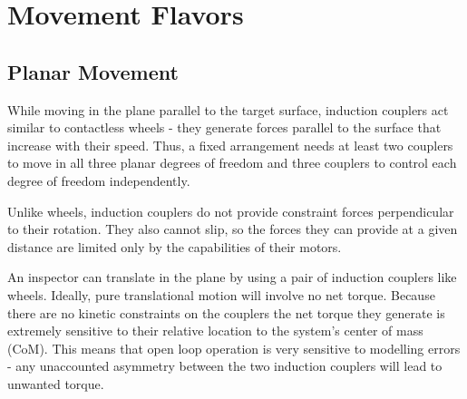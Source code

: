 \documentclass[letterpaper, 10 pt, conference]{ieeeconf}  %
\begin{document}
%

\section{Movement Flavors}\label{sec:movements}
\subsection{Planar Movement}\label{sec:planar_locomotion}
While moving in the plane parallel to the target surface, induction couplers act similar to contactless wheels - they generate forces parallel to the surface that increase with their speed. Thus, a fixed arrangement needs at least two couplers to move in all three planar degrees of freedom and three couplers to control each degree of freedom independently.    
% 

Unlike wheels, induction couplers do not provide constraint forces perpendicular to their rotation. They also cannot slip, so the forces they can provide at a given distance are limited only by the capabilities of their motors. 
%

An inspector can translate in the plane by using a pair of induction couplers like wheels. Ideally, pure translational motion will involve no net torque. Because there are no kinetic constraints on the couplers the net torque they generate is extremely sensitive to their relative location to the system's center of mass (CoM)\label{def:com}. This means that open loop operation is very sensitive to modelling errors - any unaccounted asymmetry between the two induction couplers will lead to unwanted torque. 
\end{document}
